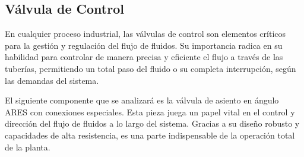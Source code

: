 \subsection{Válvula de Control} \label{sec:valvula_OnOff}

En cualquier proceso industrial, las válvulas de control son elementos críticos para la gestión y regulación del flujo de fluidos.
Su importancia radica en su habilidad para controlar de manera precisa y eficiente el flujo a través de las tuberías, permitiendo un
total paso del fluido o su completa interrupción, según las demandas del sistema.

El siguiente componente que se analizará es la válvula de asiento en ángulo ARES con conexiones especiales. Esta pieza juega un papel vital en el control y dirección del flujo de fluidos a lo largo del sistema. Gracias a su diseño robusto y capacidades de alta resistencia, es una parte indispensable de la operación total de la planta.




